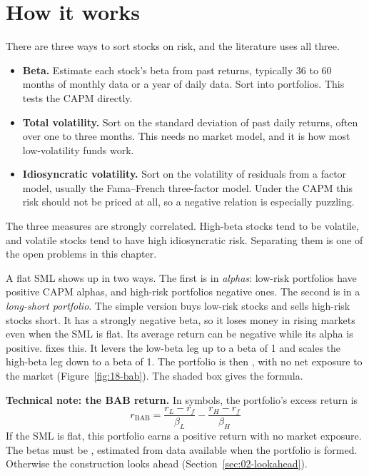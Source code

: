 \section{How it works}
\label{sec:18-how}

There are three ways to sort stocks on risk, and the literature uses all three.

\begin{itemize}
  \item \textbf{Beta.} Estimate each stock's beta from past returns, typically 36 to 60 months of monthly data or a year of daily data. Sort into portfolios. This tests the CAPM directly.
  \item \textbf{Total volatility.} Sort on the standard deviation of past daily returns, often over one to three months. This needs no market model, and it is how most low-volatility funds work.
  \item \textbf{Idiosyncratic volatility.} Sort on the volatility of residuals from a factor model, usually the Fama--French three-factor model. Under the CAPM this risk should not be priced at all, so a negative relation is especially puzzling.
\end{itemize}

The three measures are strongly correlated. High-beta stocks tend to be volatile, and volatile stocks tend to have high idiosyncratic risk. Separating them is one of the open problems in this chapter.

A flat SML shows up in two ways. The first is in \emph{alphas}: low-risk portfolios have positive CAPM alphas, and high-risk portfolios negative ones. The second is in a \emph{long-short portfolio}. The simple version buys low-risk stocks and sells high-risk stocks short. It has a strongly negative beta, so it loses money in rising markets even when the SML is flat. Its average return can be negative while its alpha is positive.  fixes this. It levers the low-beta leg up to a beta of 1 and scales the high-beta leg down to a beta of 1. The portfolio is then , with no net exposure to the market (Figure~\ref{fig:18-bab}). The shaded box gives the formula.

\begin{technote}
\textbf{Technical note: the BAB return.} In symbols, the portfolio's excess return is
\begin{equation}
  r_{\mathrm{BAB}} = \frac{r_L - r_f}{\beta_L} - \frac{r_H - r_f}{\beta_H}
  \label{eq:18-bab}
\end{equation}
If the SML is flat, this portfolio earns a positive return with no market exposure. The betas must be , estimated from data available when the portfolio is formed. Otherwise the construction looks ahead (Section~\ref{sec:02-lookahead}).
\end{technote}

